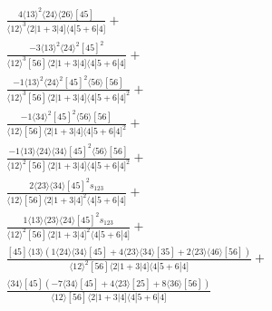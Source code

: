 \documentclass[varwidth, border=5pt]{standalone}
\begin{document}
\begin{my}
$\begin{gathered}
\scriptscriptstyle\frac{4⟨13⟩^2⟨24⟩⟨26⟩[45]}{⟨12⟩^3⟨2|1+3|4]⟨4|5+6|4]}+\\
\scriptscriptstyle\frac{-3⟨13⟩^2⟨24⟩^2[45]^2}{⟨12⟩^3[56]⟨2|1+3|4]⟨4|5+6|4]}+\\
\scriptscriptstyle\frac{-1⟨13⟩^2⟨24⟩^2[45]^2⟨56⟩[56]}{⟨12⟩^3[56]⟨2|1+3|4]⟨4|5+6|4]^2}+\\
\scriptscriptstyle\frac{-1⟨34⟩^2[45]^2⟨56⟩[56]}{⟨12⟩[56]⟨2|1+3|4]⟨4|5+6|4]^2}+\\
\scriptscriptstyle\frac{-1⟨13⟩⟨24⟩⟨34⟩[45]^2⟨56⟩[56]}{⟨12⟩^2[56]⟨2|1+3|4]⟨4|5+6|4]^2}+\\
\scriptscriptstyle\frac{2⟨23⟩⟨34⟩[45]^2s_{123}}{⟨12⟩[56]⟨2|1+3|4]^2⟨4|5+6|4]}+\\
\scriptscriptstyle\frac{1⟨13⟩⟨23⟩⟨24⟩[45]^2s_{123}}{⟨12⟩^2[56]⟨2|1+3|4]^2⟨4|5+6|4]}+\\
\scriptscriptstyle\frac{[45]⟨13⟩(1⟨24⟩⟨34⟩[45]+4⟨23⟩⟨34⟩[35]+2⟨23⟩⟨46⟩[56])}{⟨12⟩^2[56]⟨2|1+3|4]⟨4|5+6|4]}+\\
\scriptscriptstyle\frac{⟨34⟩[45](-7⟨34⟩[45]+4⟨23⟩[25]+8⟨36⟩[56])}{⟨12⟩[56]⟨2|1+3|4]⟨4|5+6|4]}\phantom{+}
\end{gathered}$
\end{my}
\end{document}

